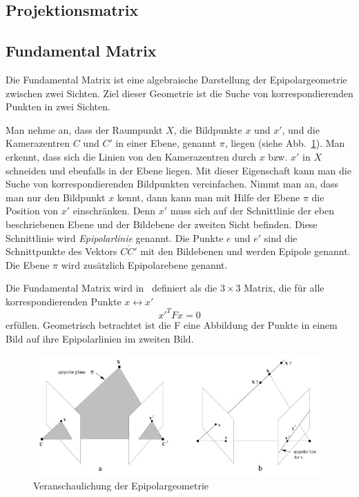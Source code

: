 \subsection{Projektionsmatrix}

\subsection{Fundamental Matrix}
Die Fundamental Matrix ist eine algebraische Darstellung der Epipolargeometrie zwischen zwei Sichten.
Ziel dieser Geometrie ist die Suche von korrespondierenden Punkten in zwei Sichten.

Man nehme an, dass der Raumpunkt $X$, die Bildpunkte $x$ und $x'$, und die Kamerazentren $C$ und $C'$ in einer Ebene, genannt $\pi$, liegen (siehe Abb.~\ref{fig:theory-fundamental-matrix}).
Man erkennt, dass sich die Linien von den Kamerazentren durch $x$ bzw. $x'$ in $X$ schneiden und ebenfalls in der Ebene liegen.
Mit dieser Eigenschaft kann man die Suche von korrespondierenden Bildpunkten vereinfachen.
Nimmt man an, dass man nur den Bildpunkt $x$ kennt, dann kann man mit Hilfe der Ebene $\pi$ die Position von $x'$ einschränken.
Denn $x'$ muss sich auf der Schnittlinie der eben beschriebenen Ebene und der Bildebene der zweiten Sicht befinden. 
Diese Schnittlinie wird \emph{Epipolarlinie} genannt.
Die Punkte $e$ und $e'$ sind die Schnittpunkte des Vektors $\overline{CC'}$ mit den Bildebenen und werden Epipole genannt.
Die Ebene $\pi$ wird zusätzlich Epipolarebene genannt.
~\cite[Kapitel 9,1]{hartley_2000}

Die Fundamental Matrix wird in~\cite[Kapitel 9.2]{hartley_2000} definiert als die $3\times 3$ Matrix, die für alle korrespondierenden Punkte $x \leftrightarrow x'$ 
\[ x'^TFx=0\] 
erfüllen.
Geometrisch betrachtet ist die F eine Abbildung der Punkte in einem Bild auf ihre Epipolarlinien im zweiten Bild.

\begin{figure}[h!]
    \centering
    \includegraphics{src/img/hartley_2000_fundamental_matrix.jpg}
    \caption{Veranschaulichung der Epipolargeometrie~\cite[Fig. 9.1]{hartley_2000}}
    \label{fig:theory-fundamental-matrix}
\end{figure}







